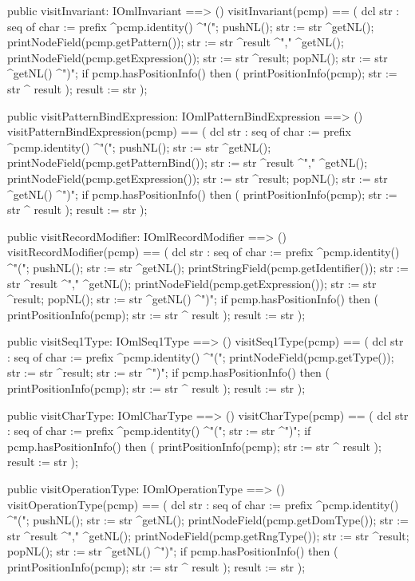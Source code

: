 \begin{vdm_al}
  public visitInvariant: IOmlInvariant ==> ()
  visitInvariant(pcmp) ==
    ( dcl str : seq of char := prefix ^pcmp.identity() ^"(";
      pushNL();
      str := str ^getNL();
      printNodeField(pcmp.getPattern());
      str := str ^result ^"," ^getNL();
      printNodeField(pcmp.getExpression());
      str := str ^result;
      popNL();
      str := str ^getNL() ^")";
      if pcmp.hasPositionInfo()
      then ( printPositionInfo(pcmp);
             str := str ^ result );
      result := str );

  public visitPatternBindExpression: IOmlPatternBindExpression ==> ()
  visitPatternBindExpression(pcmp) ==
    ( dcl str : seq of char := prefix ^pcmp.identity() ^"(";
      pushNL();
      str := str ^getNL();
      printNodeField(pcmp.getPatternBind());
      str := str ^result ^"," ^getNL();
      printNodeField(pcmp.getExpression());
      str := str ^result;
      popNL();
      str := str ^getNL() ^")";
      if pcmp.hasPositionInfo()
      then ( printPositionInfo(pcmp);
             str := str ^ result );
      result := str );

  public visitRecordModifier: IOmlRecordModifier ==> ()
  visitRecordModifier(pcmp) ==
    ( dcl str : seq of char := prefix ^pcmp.identity() ^"(";
      pushNL();
      str := str ^getNL();
      printStringField(pcmp.getIdentifier());
      str := str ^result ^"," ^getNL();
      printNodeField(pcmp.getExpression());
      str := str ^result;
      popNL();
      str := str ^getNL() ^")";
      if pcmp.hasPositionInfo()
      then ( printPositionInfo(pcmp);
             str := str ^ result );
      result := str );

  public visitSeq1Type: IOmlSeq1Type ==> ()
  visitSeq1Type(pcmp) ==
    ( dcl str : seq of char := prefix ^pcmp.identity() ^"(";
      printNodeField(pcmp.getType());
      str := str ^result;
      str := str ^")";
      if pcmp.hasPositionInfo()
      then ( printPositionInfo(pcmp);
             str := str ^ result );
      result := str );

  public visitCharType: IOmlCharType ==> ()
  visitCharType(pcmp) ==
    ( dcl str : seq of char := prefix ^pcmp.identity() ^"(";
      str := str ^")";
      if pcmp.hasPositionInfo()
      then ( printPositionInfo(pcmp);
             str := str ^ result );
      result := str );

  public visitOperationType: IOmlOperationType ==> ()
  visitOperationType(pcmp) ==
    ( dcl str : seq of char := prefix ^pcmp.identity() ^"(";
      pushNL();
      str := str ^getNL();
      printNodeField(pcmp.getDomType());
      str := str ^result ^"," ^getNL();
      printNodeField(pcmp.getRngType());
      str := str ^result;
      popNL();
      str := str ^getNL() ^")";
      if pcmp.hasPositionInfo()
      then ( printPositionInfo(pcmp);
             str := str ^ result );
      result := str );


\end{vdm_al}
